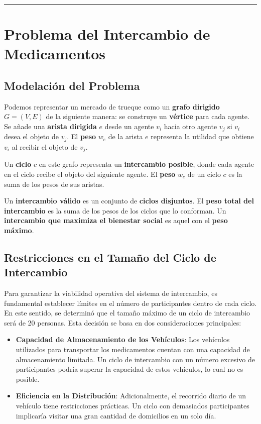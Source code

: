 \documentclass[twocolumn, fontsize=10pt]{article}
\begin{document}
\rule{\linewidth}{0.5pt}


\section{Problema del Intercambio de Medicamentos}

\subsection{Modelación del Problema}

Podemos representar un mercado de trueque como un \textbf{grafo dirigido} \( G = (V, E) \) de la siguiente manera: se construye un \textbf{vértice} para cada agente. Se añade una \textbf{arista dirigida} \( e \) desde un agente \( v_i \) hacia otro agente \( v_j \) si \( v_i \) desea el objeto de \( v_j \). El \textbf{peso} \( w_e \) de la arista \( e \) representa la utilidad que obtiene \( v_i \) al recibir el objeto de \( v_j \).  

Un \textbf{ciclo} \( c \) en este grafo representa un \textbf{intercambio posible}, donde cada agente en el ciclo recibe el objeto del siguiente agente. El \textbf{peso} \( w_c \) de un ciclo \( c \) es la suma de los pesos de sus aristas.  

Un \textbf{intercambio válido} es un conjunto de \textbf{ciclos disjuntos}. El \textbf{peso total del intercambio} es la suma de los pesos de los ciclos que lo conforman. Un \textbf{intercambio que maximiza el bienestar social} es aquel con el \textbf{peso máximo}. 

\subsection{Restricciones en el Tamaño del Ciclo de Intercambio}

Para garantizar la viabilidad operativa del sistema de intercambio, es fundamental establecer límites en el número de participantes dentro de cada ciclo. En este sentido, se determinó que el tamaño máximo de un ciclo de intercambio será de 20 personas. Esta decisión se basa en dos consideraciones principales:
\begin{itemize}
    \item \textbf{Capacidad de Almacenamiento de los Vehículos}: Los vehículos utilizados para transportar los medicamentos cuentan con una capacidad de almacenamiento limitada. Un ciclo de intercambio con un número excesivo de participantes podría superar la capacidad de estos vehículos, lo cual no es posible.
    \item  \textbf{Eficiencia en la Distribución}: Adicionalmente, el recorrido diario de un vehículo tiene restricciones prácticas. Un ciclo con demasiados participantes implicaría visitar una gran cantidad de domicilios en un solo día.
\end{itemize}
    
\end{document}
